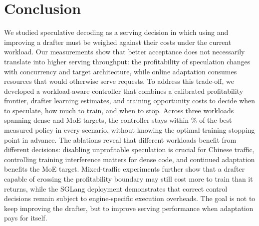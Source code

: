 
\section{Conclusion}\label{sec:conclusion}

We studied speculative decoding as a serving decision in which using and improving a drafter must be weighed against their costs under the current workload. Our measurements show that better acceptance does not necessarily translate into higher serving throughput: the profitability of speculation changes with concurrency and target architecture, while online adaptation consumes resources that would otherwise serve requests. To address this trade-off, we developed a workload-aware controller that combines a calibrated profitability frontier, drafter learning estimates, and training opportunity costs to decide when to speculate, how much to train, and when to stop. Across three workloads spanning dense and MoE targets, the controller stays within \% of the best measured policy in every scenario, without knowing the optimal training stopping point in advance. The ablations reveal that different workloads benefit from different decisions: disabling unprofitable speculation is crucial for Chinese traffic, controlling training interference matters for dense code, and continued adaptation benefits the MoE target. Mixed-traffic experiments further show that a drafter capable of crossing the profitability boundary may still cost more to train than it returns, while the SGLang deployment demonstrates that correct control decisions remain subject to engine-specific execution overheads. 
The goal is not to keep improving the drafter, but to improve serving performance when adaptation pays for itself.

